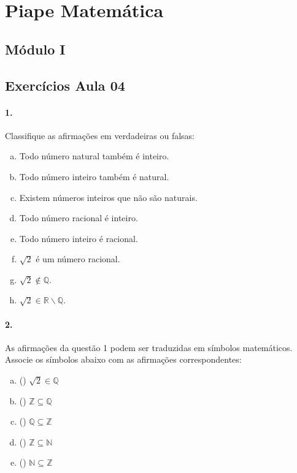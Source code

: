 \documentclass[a4paper,twocolumn,12pt]{article}
\begin{document}
 
\section*{Piape Matemática} 
 
\subsection*{Módulo I}
\subsection*{Exercícios Aula 04}

\paragraph{1.} Classifique as afirmações em verdadeiras ou falsas:
\begin{enumerate}[a)]
\item Todo número natural também é inteiro. 
\item Todo número inteiro também é natural.  
\item Existem números inteiros que não são naturais.
\item Todo número racional é inteiro. 
\item Todo número inteiro é racional.
\item $\sqrt{2}$ é um número racional.
\item $\sqrt{2} \notin \mathbb{Q}$.
\item $\sqrt{2} \in \mathbb{R\backslash Q}$.
\end{enumerate}


\paragraph*{2. } As afirmações da questão 1 podem ser traduzidas em símbolos matemáticos. Associe os símbolos abaixo com as afirmações correspondentes:
\begin{enumerate}[a)]
  \item (\hspace{7mm}) $\sqrt{2} \in \mathbb{Q}$ 
  \item (\hspace{7mm}) $\mathbb{Z} \subseteq \mathbb{Q}$
  \item (\hspace{7mm}) $\mathbb{Q} \subseteq \mathbb{Z}$
  \item (\hspace{7mm}) $\mathbb{Z} \subseteq \mathbb{N}$
  \item (\hspace{7mm}) $\mathbb{N} \subseteq \mathbb{Z}$
\end{enumerate}
\end{document}
